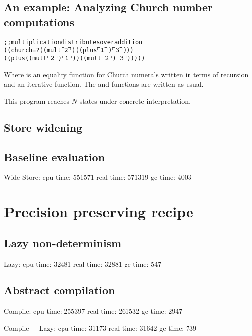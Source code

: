 \documentclass{llncs}
\begin{document}
\subsection{An example: Analyzing Church number computations}

\newcommand{\church}[1]{\(\ulcorner{\tt #1}\urcorner\)}

\begin{alltt}
;; multiplication distributes over addition
((church=? ((mult \church2) ((plus \church1) \church3)))
 ((plus ((mult \church2) \church1)) ((mult \church2) \church3)))))
\end{alltt}

Where  is an equality function for Church numerals
written in terms of recursion and an iterative  function.
The  and  functions are written as usual.

This program reaches $N$ states under concrete interpretation.

\subsection{Store widening}

\subsection{Baseline evaluation}

Wide Store: cpu time: 551571 real time: 571319 gc time: 4003

\section{Precision preserving recipe}

\subsection{Lazy non-determinism}

Lazy:
   cpu time: 32481 real time: 32881 gc time: 547

\subsection{Abstract compilation}

Compile:
   cpu time: 255397 real time: 261532 gc time: 2947

\noindent
Compile + Lazy:
   cpu time: 31173 real time: 31642 gc time: 739
\end{document}
